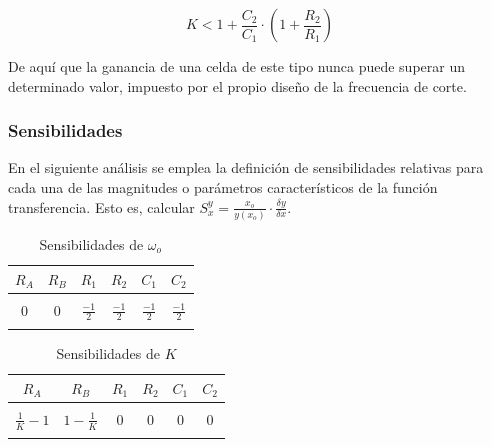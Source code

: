 \begin{equation}
K < 1 + \frac{C_2}{C_1} \cdot (1 + \frac{R_2}{R_1})
\end{equation}

De aqu\'i que la ganancia de una celda de este tipo nunca puede superar un determinado valor, impuesto por el propio dise\~no de la frecuencia de corte.

\subsubsection{Sensibilidades}
En el siguiente an\'alisis se emplea la definici\'on de sensibilidades relativas para cada una de las magnitudes o par\'ametros caracter\'isticos de la funci\'on transferencia. Esto es,
calcular $S^{y}_x = \frac{x_o}{y(x_o)} \cdot \frac{\delta y}{\delta x}$.

\begin{table}[H]
	\centering
	\begin{tabular}{c c c c c c}
		$R_A$ & $R_B$ & $R_1$ & $R_2$ & $C_1$ & $C_2$ \\
		\hline \\
		$0$ & $0$ & $\frac{-1}{2}$ & $\frac{-1}{2}$ & $\frac{-1}{2}$ & $\frac{-1}{2}$ \\
		\\
		\hline
	\end{tabular}
	\caption{Sensibilidades de $\omega_o$}
\end{table}

\begin{table}[H]
	\centering
	\begin{tabular}{c c c c c c}
		$R_A$ & $R_B$ & $R_1$ & $R_2$ & $C_1$ & $C_2$ \\
		\hline \\
		$\frac{1}{K} - 1$ & $1 - \frac{1}{K}$ & $0$ & $0$ & $0$ & $0$ \\
		\\
		\hline
	\end{tabular}
	\caption{Sensibilidades de $K$}
\end{table}

